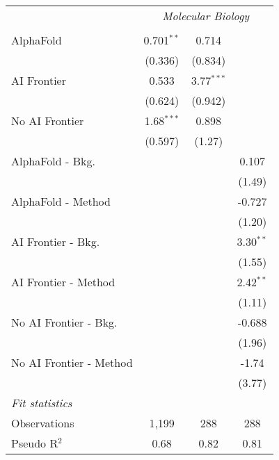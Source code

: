 \begin{tabular}{lccc}
 & \multicolumn{3}{c}{\textit{Molecular Biology}} \\ \\
   AlphaFold               & 0.701$^{**}$ & 0.714        &   \\   
                           & (0.336)      & (0.834)      &   \\   
   AI Frontier             & 0.533        & 3.77$^{***}$ &   \\   
                           & (0.624)      & (0.942)      &   \\   
   No AI Frontier          & 1.68$^{***}$ & 0.898        &   \\   
                           & (0.597)      & (1.27)       &   \\   
   AlphaFold - Bkg.        &              &              & 0.107\\   
                           &              &              & (1.49)\\   
   AlphaFold - Method      &              &              & -0.727\\   
                           &              &              & (1.20)\\   
   AI Frontier - Bkg.      &              &              & 3.30$^{**}$\\   
                           &              &              & (1.55)\\   
   AI Frontier - Method    &              &              & 2.42$^{**}$\\   
                           &              &              & (1.11)\\   
   No AI Frontier - Bkg.   &              &              & -0.688\\   
                           &              &              & (1.96)\\   
   No AI Frontier - Method &              &              & -1.74\\   
                           &              &              & (3.77)\\   
   \midrule
   \emph{Fit statistics}\\
   Observations            & 1,199        & 288          & 288\\  
   Pseudo R$^2$            & 0.68         & 0.82         & 0.81\\  
   

\end{tabular}
